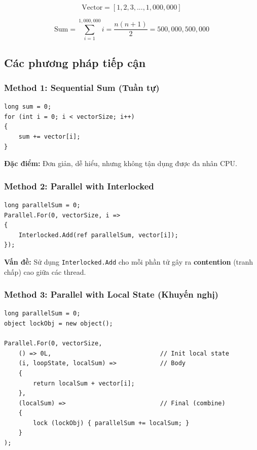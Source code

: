\documentclass[12pt,a4paper]{article}
\begin{document}
\begin{equation}
\text{Vector} = [1, 2, 3, ..., 1{,}000{,}000]
\end{equation}

\begin{equation}
\text{Sum} = \sum_{i=1}^{1{,}000{,}000} i = \frac{n(n+1)}{2} = 500{,}000{,}500{,}000
\end{equation}

\subsection{Các phương pháp tiếp cận}

\subsubsection{Method 1: Sequential Sum (Tuần tự)}

\begin{lstlisting}[language=CSharp, caption={Sequential Sum}]
long sum = 0;
for (int i = 0; i < vectorSize; i++)
{
    sum += vector[i];
}
\end{lstlisting}

\textbf{Đặc điểm:} Đơn giản, dễ hiểu, nhưng không tận dụng được đa nhân CPU.

\subsubsection{Method 2: Parallel with Interlocked}

\begin{lstlisting}[language=CSharp, caption={Parallel với Interlocked}]
long parallelSum = 0;
Parallel.For(0, vectorSize, i =>
{
    Interlocked.Add(ref parallelSum, vector[i]);
});
\end{lstlisting}

\textbf{Vấn đề:} Sử dụng \texttt{Interlocked.Add} cho mỗi phần tử gây ra \textbf{contention} (tranh chấp) cao giữa các thread.

\subsubsection{Method 3: Parallel with Local State (Khuyến nghị)}

\begin{lstlisting}[language=CSharp, caption={Parallel với Local State}]
long parallelSum = 0;
object lockObj = new object();

Parallel.For(0, vectorSize,
    () => 0L,                              // Init local state
    (i, loopState, localSum) =>            // Body
    {
        return localSum + vector[i];
    },
    (localSum) =>                          // Final (combine)
    {
        lock (lockObj) { parallelSum += localSum; }
    }
);
\end{lstlisting}
\end{document}
